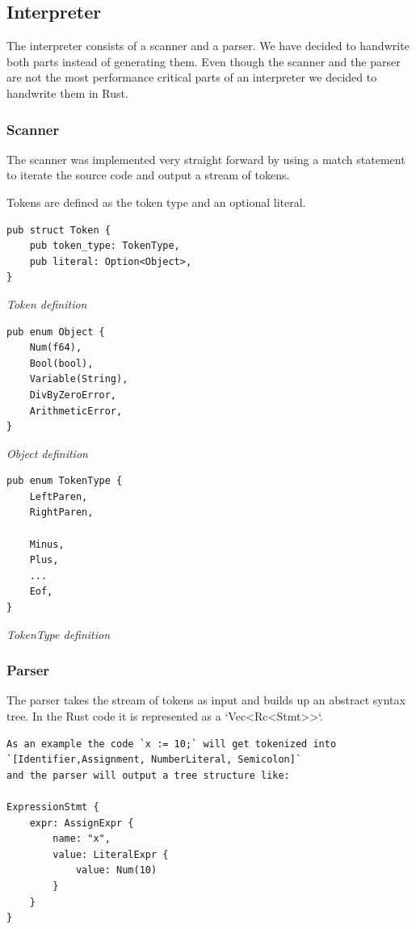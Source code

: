 \documentclass{article}
\begin{document}
\subsection{Interpreter}
The interpreter consists of a scanner and a parser. We have decided to
handwrite both parts instead of generating them. Even though the scanner and
the parser are not the most performance critical parts of an interpreter we
decided to handwrite them in Rust.

\subsubsection{Scanner}
The scanner was implemented very straight forward by using a match statement 
to iterate the source code and output a stream of tokens.

Tokens are defined as the token type and an optional literal.

\begin{verbatim}
pub struct Token {
    pub token_type: TokenType,
    pub literal: Option<Object>,
}
\end{verbatim}
\textit{Token definition}

\begin{verbatim}
pub enum Object {
    Num(f64),
    Bool(bool),
    Variable(String),
    DivByZeroError,
    ArithmeticError,
}
\end{verbatim}
\textit{Object definition}

\begin{verbatim}
pub enum TokenType {
    LeftParen,
    RightParen,

    Minus,
    Plus,
    ...
    Eof,
}
\end{verbatim}
\textit{TokenType definition}

\subsubsection{Parser}
The parser takes the stream of tokens as input and builds up an abstract syntax
tree. In the Rust code it is represented as a `Vec<Rc<Stmt>>`.

\begin{verbatim}
As an example the code `x := 10;` will get tokenized into 
`[Identifier,Assignment, NumberLiteral, Semicolon]` 
and the parser will output a tree structure like:

ExpressionStmt {
    expr: AssignExpr {
        name: "x",
        value: LiteralExpr {
            value: Num(10)
        }
    }
}
\end{verbatim}
\end{document}
